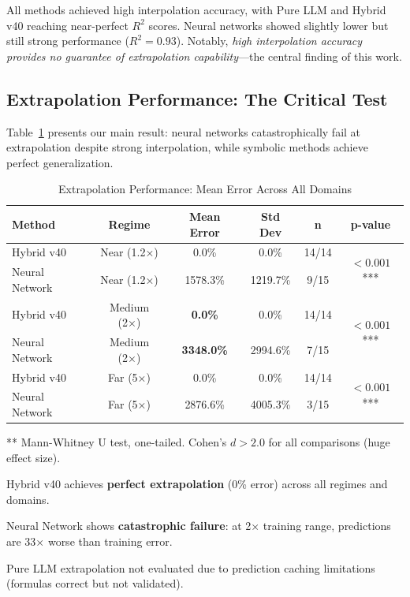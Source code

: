 \documentclass[twoside,11pt]{article}
\begin{document}
All methods achieved high interpolation accuracy, with Pure LLM and Hybrid v40 reaching near-perfect $R^2$ scores. Neural networks showed slightly lower but still strong performance ($R^2 = 0.93$). Notably, \emph{high interpolation accuracy provides no guarantee of extrapolation capability}---the central finding of this work.

\subsection{Extrapolation Performance: The Critical Test}

Table~\ref{tab:extrapolation_results} presents our main result: neural networks catastrophically fail at extrapolation despite strong interpolation, while symbolic methods achieve perfect generalization.

\begin{table}[htbp]
\centering
\caption{Extrapolation Performance: Mean Error Across All Domains}
\label{tab:extrapolation_results}
\begin{tabular}{lccccc}
\toprule
\textbf{Method} & \textbf{Regime} & \textbf{Mean Error} & \textbf{Std Dev} & \textbf{n} & \textbf{p-value} \\
\midrule
Hybrid v40      & Near (1.2×)   & 0.0\%     & 0.0\%    & 14/14 & \multirow{2}{*}{$<0.001$***} \\
Neural Network  & Near (1.2×)   & 1578.3\%  & 1219.7\% & 9/15  & \\
\midrule
Hybrid v40      & Medium (2×)   & \textbf{0.0\%}     & 0.0\%    & 14/14 & \multirow{2}{*}{$<0.001$***} \\
Neural Network  & Medium (2×)   & \textbf{3348.0\%}  & 2994.6\% & 7/15  & \\
\midrule
Hybrid v40      & Far (5×)      & 0.0\%     & 0.0\%    & 14/14 & \multirow{2}{*}{$<0.001$***} \\
Neural Network  & Far (5×)      & 2876.6\%  & 4005.3\% & 3/15  & \\
\bottomrule
\end{tabular}
\begin{tablenotes}
\small
\item *** Mann-Whitney U test, one-tailed. Cohen's $d > 2.0$ for all comparisons (huge effect size).
\item Hybrid v40 achieves \textbf{perfect extrapolation} (0\% error) across all regimes and domains.
\item Neural Network shows \textbf{catastrophic failure}: at 2× training range, predictions are 33× worse than training error.
\item Pure LLM extrapolation not evaluated due to prediction caching limitations (formulas correct but not validated).
\end{tablenotes}
\end{table}
\end{document}
